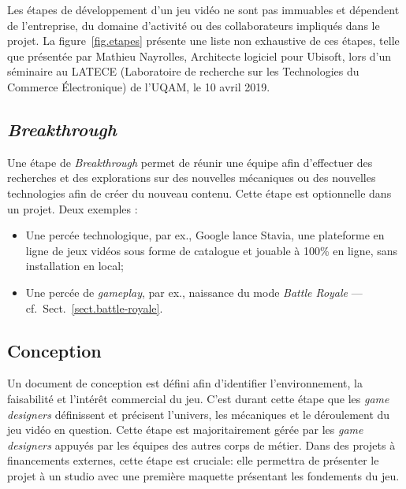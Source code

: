 Les étapes de développement d'un jeu vidéo ne sont pas immuables et dépendent de l'entreprise, du domaine d'activité ou des collaborateurs impliqués dans le projet.
La figure~\ref{fig.etapes} présente une liste non exhaustive de ces étapes, telle que présentée par Mathieu Nayrolles, Architecte logiciel pour Ubisoft, lors d’un séminaire au LATECE (Laboratoire de recherche sur les Technologies du Commerce Électronique) de l’UQAM, le 10 avril 2019.



\subsection{\emph{Breakthrough}}

Une étape de \emph{Breakthrough} permet de réunir une équipe afin d'effectuer des recherches et des explorations sur des nouvelles mécaniques ou des nouvelles technologies afin de créer du nouveau contenu.
Cette étape est optionnelle dans un projet.
Deux exemples :
\begin{itemize}
    \item Une percée technologique, par ex., Google lance Stavia, une plateforme en ligne de jeux vidéos sous forme de catalogue et jouable à 100\% en ligne, sans installation en local;
    \item Une percée de \emph{gameplay}, par ex., naissance du mode \emph{Battle Royale} --- cf.~Sect.~\ref{sect.battle-royale}.
\end{itemize}

\subsection{Conception}

Un document de conception est défini afin d'identifier l'environnement, la faisabilité et l'intérêt commercial du jeu.
C'est durant cette étape que les \emph{game designers} définissent et précisent l'univers, les mécaniques et le déroulement du jeu vidéo en question.
Cette étape est majoritairement gérée par les \emph{game designers} appuyés par les équipes des autres corps de métier.
Dans des projets à financements externes, cette étape est cruciale: elle permettra de présenter le projet à un studio avec une première maquette présentant les fondements du jeu.

